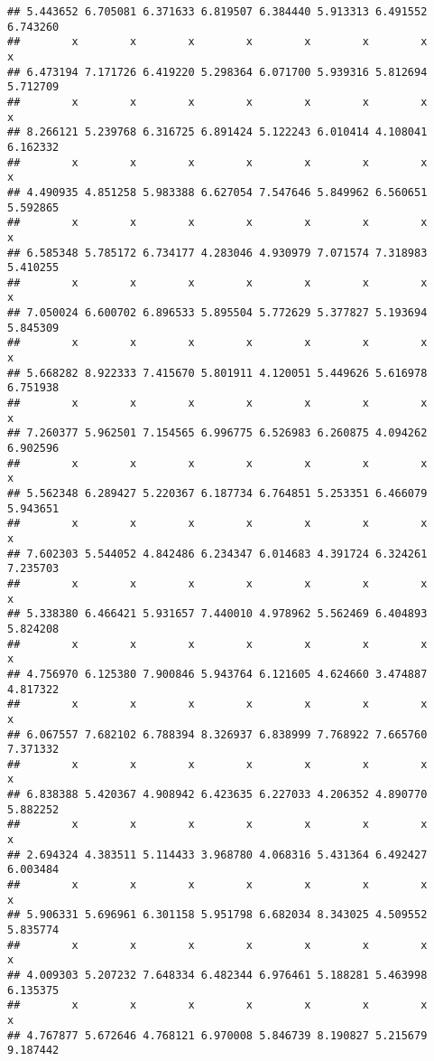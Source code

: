 \documentclass[a4paper,10pt]{book}\usepackage[]{graphicx}\usepackage[]{color}
\makeatletter
\newenvironment{kframe}{%
 \def\at@end@of@kframe{}%
 \ifinner\ifhmode%
  \def\at@end@of@kframe{\end{minipage}}%
  \begin{minipage}{\columnwidth}%
 \fi\fi%
 \def\FrameCommand##1{\hskip\@totalleftmargin \hskip-\fboxsep
 \colorbox{shadecolor}{##1}\hskip-\fboxsep
     \hskip-\linewidth \hskip-\@totalleftmargin \hskip\columnwidth}%
 \MakeFramed {\advance\hsize-\width
   \@totalleftmargin\z@ \linewidth\hsize
   \@setminipage}}%
 {\par\unskip\endMakeFramed%
 \at@end@of@kframe}
\newenvironment{knitrout}{}{} %
\makeatother
\begin{document}
\begin{knitrout}
\begin{kframe}
\begin{verbatim}
## 5.443652 6.705081 6.371633 6.819507 6.384440 5.913313 6.491552 6.743260 
##        x        x        x        x        x        x        x        x 
## 6.473194 7.171726 6.419220 5.298364 6.071700 5.939316 5.812694 5.712709 
##        x        x        x        x        x        x        x        x 
## 8.266121 5.239768 6.316725 6.891424 5.122243 6.010414 4.108041 6.162332 
##        x        x        x        x        x        x        x        x 
## 4.490935 4.851258 5.983388 6.627054 7.547646 5.849962 6.560651 5.592865 
##        x        x        x        x        x        x        x        x 
## 6.585348 5.785172 6.734177 4.283046 4.930979 7.071574 7.318983 5.410255 
##        x        x        x        x        x        x        x        x 
## 7.050024 6.600702 6.896533 5.895504 5.772629 5.377827 5.193694 5.845309 
##        x        x        x        x        x        x        x        x 
## 5.668282 8.922333 7.415670 5.801911 4.120051 5.449626 5.616978 6.751938 
##        x        x        x        x        x        x        x        x 
## 7.260377 5.962501 7.154565 6.996775 6.526983 6.260875 4.094262 6.902596 
##        x        x        x        x        x        x        x        x 
## 5.562348 6.289427 5.220367 6.187734 6.764851 5.253351 6.466079 5.943651 
##        x        x        x        x        x        x        x        x 
## 7.602303 5.544052 4.842486 6.234347 6.014683 4.391724 6.324261 7.235703 
##        x        x        x        x        x        x        x        x 
## 5.338380 6.466421 5.931657 7.440010 4.978962 5.562469 6.404893 5.824208 
##        x        x        x        x        x        x        x        x 
## 4.756970 6.125380 7.900846 5.943764 6.121605 4.624660 3.474887 4.817322 
##        x        x        x        x        x        x        x        x 
## 6.067557 7.682102 6.788394 8.326937 6.838999 7.768922 7.665760 7.371332 
##        x        x        x        x        x        x        x        x 
## 6.838388 5.420367 4.908942 6.423635 6.227033 4.206352 4.890770 5.882252 
##        x        x        x        x        x        x        x        x 
## 2.694324 4.383511 5.114433 3.968780 4.068316 5.431364 6.492427 6.003484 
##        x        x        x        x        x        x        x        x 
## 5.906331 5.696961 6.301158 5.951798 6.682034 8.343025 4.509552 5.835774 
##        x        x        x        x        x        x        x        x 
## 4.009303 5.207232 7.648334 6.482344 6.976461 5.188281 5.463998 6.135375 
##        x        x        x        x        x        x        x        x 
## 4.767877 5.672646 4.768121 6.970008 5.846739 8.190827 5.215679 9.187442 

\end{verbatim}
\end{kframe}
\end{knitrout}
\end{document}
